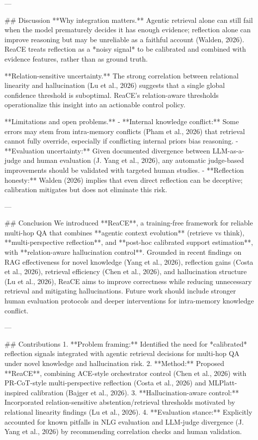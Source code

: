 ---

## Discussion  
**Why integration matters.** Agentic retrieval alone can still fail when the model prematurely decides it has enough evidence; reflection alone can improve reasoning but may be unreliable as a faithful account (Walden, 2026). ReaCE treats reflection as a *noisy signal* to be calibrated and combined with evidence features, rather than as ground truth.

**Relation-sensitive uncertainty.** The strong correlation between relational linearity and hallucination (Lu et al., 2026) suggests that a single global confidence threshold is suboptimal. ReaCE’s relation-aware thresholds operationalize this insight into an actionable control policy.

**Limitations and open problems.**  
- **Internal knowledge conflict:** Some errors may stem from intra-memory conflicts (Pham et al., 2026) that retrieval cannot fully override, especially if conflicting internal priors bias reasoning.  
- **Evaluation uncertainty:** Given documented divergence between LLM-as-a-judge and human evaluation (J. Yang et al., 2026), any automatic judge-based improvements should be validated with targeted human studies.  
- **Reflection honesty:** Walden (2026) implies that even direct reflection can be deceptive; calibration mitigates but does not eliminate this risk.

---

## Conclusion  
We introduced **ReaCE**, a training-free framework for reliable multi-hop QA that combines **agentic context evolution** (retrieve vs think), **multi-perspective reflection**, and **post-hoc calibrated support estimation**, with **relation-aware hallucination control**. Grounded in recent findings on RAG effectiveness for novel knowledge (Yang et al., 2026), reflection gains (Costa et al., 2026), retrieval efficiency (Chen et al., 2026), and hallucination structure (Lu et al., 2026), ReaCE aims to improve correctness while reducing unnecessary retrieval and mitigating hallucinations. Future work should include stronger human evaluation protocols and deeper interventions for intra-memory knowledge conflict.

---

## Contributions  
1. **Problem framing:** Identified the need for *calibrated* reflection signals integrated with agentic retrieval decisions for multi-hop QA under novel knowledge and hallucination risk.  
2. **Method:** Proposed **ReaCE**, combining ACE-style orchestrator control (Chen et al., 2026) with PR-CoT-style multi-perspective reflection (Costa et al., 2026) and MLPlatt-inspired calibration (Bajger et al., 2026).  
3. **Hallucination-aware control:** Incorporated relation-sensitive abstention/retrieval thresholds motivated by relational linearity findings (Lu et al., 2026).  
4. **Evaluation stance:** Explicitly accounted for known pitfalls in NLG evaluation and LLM-judge divergence (J. Yang et al., 2026) by recommending correlation checks and human validation.

